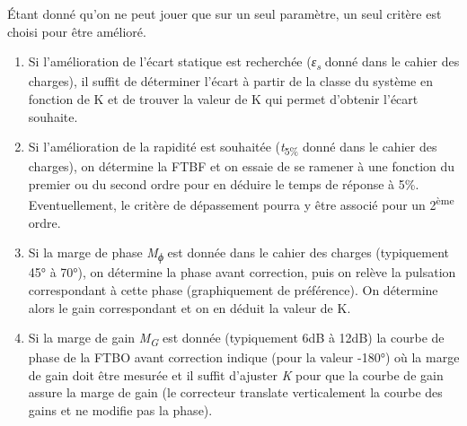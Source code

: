 Étant donné qu'on ne peut jouer que sur un seul paramètre, un seul critère est choisi pour être amélioré.

\begin{enumerate}
\def\labelenumi{\arabic{enumi}.}
\item
  Si l'amélioration de l'écart statique est recherchée (\emph{ε\textsubscript{s}} donné dans le cahier des charges), il suffit de déterminer l'écart à partir de la classe du système en fonction de K et de trouver la valeur de K qui permet d'obtenir l'écart souhaite.
\item
  Si l'amélioration de la rapidité est souhaitée (\emph{t}\textsubscript{5\%} donné dans le cahier des charges), on détermine la FTBF et on essaie de se ramener à une fonction du premier ou du second ordre pour en déduire le temps de réponse à 5\%. Eventuellement, le critère de dépassement pourra y être associé pour un 2\textsuperscript{ème} ordre.
\item
  Si la marge de phase \emph{M\textsubscript{ϕ}} est donnée dans le cahier des charges (typiquement 45° à 70°), on détermine la phase avant correction, puis on relève la pulsation correspondant à cette phase (graphiquement de préférence). On détermine alors le gain correspondant et on en déduit la valeur de K.
\item
  Si la marge de gain \emph{M\textsubscript{G}} est donnée (typiquement 6dB à 12dB) la courbe de phase de la FTBO avant correction indique (pour la valeur -180°) où la marge de gain doit être mesurée et il suffit d'ajuster \emph{K} pour que la courbe de gain assure la marge de gain (le correcteur translate verticalement la courbe des gains et ne modifie pas la phase).
\end{enumerate}

